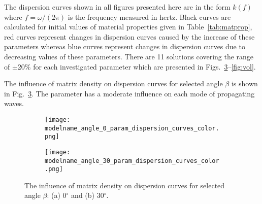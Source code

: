 \documentclass[preprint,12pt]{elsarticle}
\begin{document}
 The dispersion curves shown in all figures presented here are in the form $k(f)$ where $f=\omega/(2 \pi)$ is the frequency measured in hertz. Black curves are calculated for initial values of material properties given in Table~\ref{tab:matprop}, red curves represent changes in dispersion curves caused by the increase of these parameters whereas blue curves represent changes in dispersion curves due to decreasing values of these parameters. There are 11 solutions covering the range of $\pm$20\% for each investigated parameter which are presented in Figs.~\ref{fig:rhom}--\ref{fig:vol}.
 
 The influence of matrix density on dispersion curves for selected angle $\beta$ is shown in Fig.~\ref{fig:rhom}. The parameter has a moderate influence on each mode of propagating waves.
 
 \begin{figure} [h!]
 	\newcommand{\modelname}{SASE2_plain_weave}
 	\centering
 	\begin{subfigure}[b]{0.49\textwidth}
 		\centering
 		\texttt{[image: \\modelname\_angle\_0\_param\_dispersion\_curves\_color.png]}
 		\caption{}
 		\label{fig:rhom0}
 	\end{subfigure}
 	\hfill
 	\begin{subfigure}[b]{0.49\textwidth}
 		\centering
 		\texttt{[image: \\modelname\_angle\_30\_param\_dispersion\_curves\_color.png]}
 		\caption{}
 		\label{fig:rhom30}
 	\end{subfigure}
 	\caption{The influence of matrix density on dispersion curves for selected angle $\beta$: (a) 0$^{\circ}$ and (b) 30$^{\circ}$.} 
 	\label{fig:rhom}
 \end{figure}
\clearpage
\end{document}
